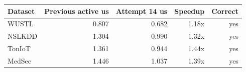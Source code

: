 \begin{tabular}{lrrrr}
\toprule
Dataset & Previous active us & Attempt 14 us & Speedup & Correct \\
\midrule
WUSTL & 0.807 & 0.682 & 1.18x & yes \\
NSLKDD & 1.304 & 0.990 & 1.32x & yes \\
TonIoT & 1.361 & 0.944 & 1.44x & yes \\
MedSec & 1.446 & 1.037 & 1.39x & yes \\
\bottomrule
\end{tabular}
